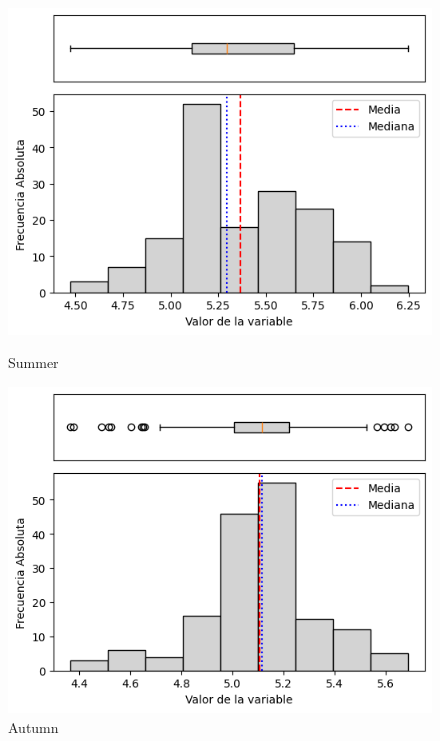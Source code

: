 \begin{figure}[htbp]
\centering
\begin{minipage}{0.30\textwidth}
  \includegraphics[width=\linewidth]{resultados/por_estacion_del_anio/boxplot_clases_por_estacion/Andahuaylas/PET_HistBoxplot_Summer.png}
  \caption*{Summer}
\end{minipage}
\hfill
\begin{minipage}{0.30\textwidth}
  \includegraphics[width=\linewidth]{resultados/por_estacion_del_anio/boxplot_clases_por_estacion/Andahuaylas/PET_HistBoxplot_Autumn.png}
  \caption*{Autumn}
\end{minipage}


\end{figure}
